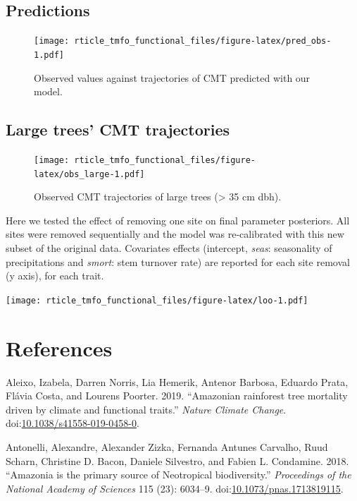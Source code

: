 \documentclass[]{elsarticle} %
\begin{document}
\subsection{Predictions}\label{predictions-1}

\begin{figure}
\centering
\texttt{[image: rticle\_tmfo\_functional\_files/figure-latex/pred\_obs-1.pdf]}
\caption{\label{sfig:pred_traj} Observed values against trajectories of
CMT predicted with our model.}
\end{figure}

\subsection{Large trees' CMT
trajectories}\label{large-trees-cmt-trajectories}

\begin{figure}
\centering
\texttt{[image: rticle\_tmfo\_functional\_files/figure-latex/obs\_large-1.pdf]}
\caption{\label{sfig:pred_traj} Observed CMT trajectories of large trees
(\textgreater{} 35 cm dbh).}
\end{figure}

Here we tested the effect of removing one site on final parameter
posteriors. All sites were removed sequentially and the model was
re-calibrated with this new subset of the original data. Covariates
effects (intercept, \emph{seas}: seasonality of precipitations and
\emph{smort}: stem turnover rate) are reported for each site removal (y
axis), for each trait.

\texttt{[image: rticle\_tmfo\_functional\_files/figure-latex/loo-1.pdf]}

\section*{References}\label{references}

\hypertarget{refs}{}
\hypertarget{ref-Aleixo2019}{}
Aleixo, Izabela, Darren Norris, Lia Hemerik, Antenor Barbosa, Eduardo
Prata, Flávia Costa, and Lourens Poorter. 2019. ``Amazonian rainforest
tree mortality driven by climate and functional traits.'' \emph{Nature
Climate Change}.
doi:\href{https://doi.org/10.1038/s41558-019-0458-0}{10.1038/s41558-019-0458-0}.

\hypertarget{ref-Antonelli2018}{}
Antonelli, Alexandre, Alexander Zizka, Fernanda Antunes Carvalho, Ruud
Scharn, Christine D. Bacon, Daniele Silvestro, and Fabien L. Condamine.
2018. ``Amazonia is the primary source of Neotropical biodiversity.''
\emph{Proceedings of the National Academy of Sciences} 115 (23):
6034--9.
doi:\href{https://doi.org/10.1073/pnas.1713819115}{10.1073/pnas.1713819115}.
\end{document}
